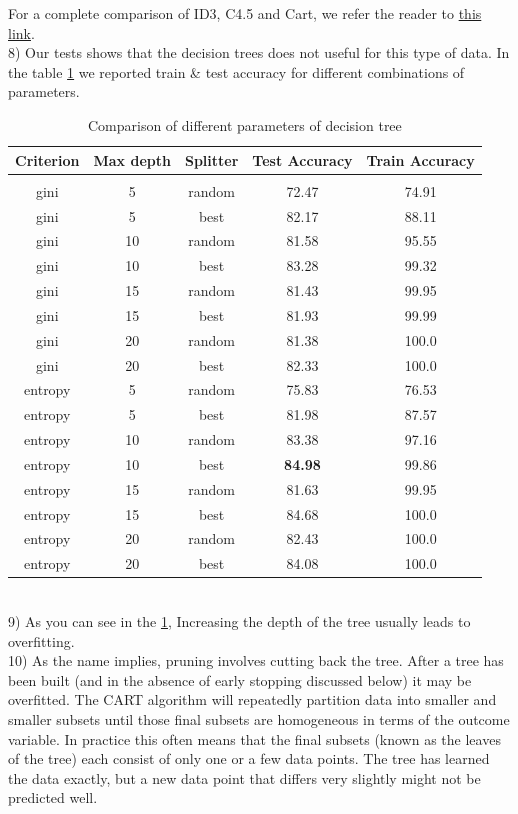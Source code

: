 \documentclass[11pt]{article}
\begin{document}
For a complete comparison of ID3, C4.5 and Cart, we refer the reader to \href{https://link.springer.com/chapter/10.1007/978-81-322-2205-7_51}{this link}.
\\
8) Our tests shows that the decision trees does not useful for this type of data. In the table \ref{tbl:2} we reported train \& test accuracy for different combinations of parameters.
\begin{table}[]
\centering
\begin{tabular}{@{}ccccc@{}}
\toprule
\textbf{Criterion} & \textbf{Max depth} & \textbf{Splitter} & \textbf{Test Accuracy} & \textbf{Train Accuracy} \\ \midrule
 \\ \midrule
gini & 5 & random & 72.47 & 74.91 \\
gini & 5 & best & 82.17 & 88.11 \\
gini & 10 & random & 81.58 & 95.55 \\
gini & 10 & best & 83.28 & 99.32 \\
gini & 15 & random & 81.43 & 99.95 \\
gini & 15 & best & 81.93 & 99.99 \\
gini & 20 & random & 81.38 & 100.0 \\
gini & 20 & best & 82.33 & 100.0 \\
entropy & 5 & random & 75.83 & 76.53 \\
entropy & 5 & best & 81.98 & 87.57 \\
entropy & 10 & random & 83.38 & 97.16 \\
entropy & 10 & best & \textbf{84.98} & 99.86 \\
entropy & 15 & random & 81.63 & 99.95 \\
entropy & 15 & best & 84.68 & 100.0 \\
entropy & 20 & random & 82.43 & 100.0 \\
entropy & 20 & best & 84.08 & 100.0 \\ \bottomrule
\end{tabular}
\caption{Comparison of different parameters of decision tree}
\label{tbl:2}
\end{table}
\\
9) As you can see in the \ref{tbl:2}, Increasing the depth of the tree usually leads to overfitting. 
\\
10) As the name implies, pruning involves cutting back the tree. After a tree has been built (and in the absence of early stopping discussed below) it may be overfitted. The CART algorithm will repeatedly partition data into smaller and smaller subsets until those final subsets are homogeneous in terms of the outcome variable. In practice this often means that the final subsets (known as the leaves of the tree) each consist of only one or a few data points. The tree has learned the data exactly, but a new data point that differs very slightly might not be predicted well.
\end{document}
